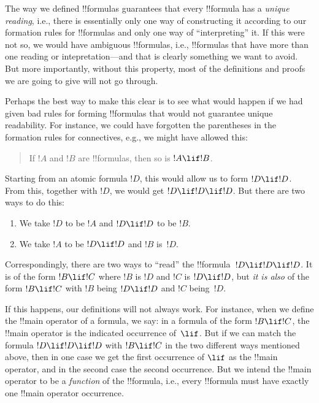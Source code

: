 

\begin{explain}
The way we defined !!{formula}s guarantees that every !!{formula} has
a \emph{unique reading}, i.e., there is essentially only one way of
constructing it according to our formation rules for !!{formula}s and
only one way of ``interpreting'' it.  If this were not so, we would
have ambiguous !!{formula}s, i.e., !!{formula}s that have more than
one reading or intepretation---and that is clearly something we want
to avoid.  But more importantly, without this property, most of the
definitions and proofs we are going to give will not go through.

Perhaps the best way to make this clear is to see what would happen if
we had given bad rules for forming !!{formula}s that would not
guarantee unique readability.  For instance, we could have forgotten
the parentheses in the formation rules for connectives, e.g., we might
have allowed this:
\begin{quote}
If $!A$ and $!B$ are !!{formula}s, then so is $!A \lif !B$.
\end{quote}
Starting from an atomic formula $!D$, this would allow us to form $!D
\lif !D$. From this, together with $!D$, we would get $!D \lif !D
\lif !D$.  But there are two ways to do this:
\begin{enumerate}
\item We take $!D$ to be $!A$ and $!D \lif !D$ to be $!B$.
\item We take $!A$ to be $!D \lif !D$ and $!B$ is~$!D$.  
\end{enumerate}
Correspondingly, there are two ways to
``read'' the !!{formula}~$!D \lif !D \lif !D$. It is of the form $!B
\lif !C$ where $!B$ is $!D$ and $!C$ is $!D \lif !D$, but \emph{it is
  also} of the form $!B \lif !C$ with $!B$ being $!D \lif !D$ and $!C$
being~$!D$.

If this happens, our definitions will not always work. For instance,
when we define the !!{main operator} of a formula, we say: in a
formula of the form $!B \lif !C$, the !!{main operator} is the
indicated occurrence of~$\lif$. But if we can match the formula $!D
\lif !D \lif !D$ with $!B \lif !C$ in the two different ways mentioned
above, then in one case we get the first occurrence of $\lif$ as the
!!{main operator}, and in the second case the second occurrence.  But
we intend the !!{main operator} to be a \emph{function} of the
!!{formula}, i.e., every !!{formula} must have exactly one !!{main
  operator} occurrence.
\end{explain}

